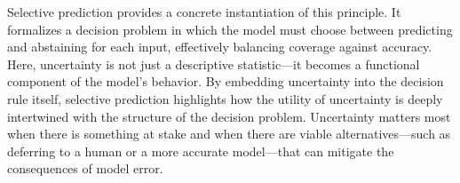 Selective prediction provides a concrete instantiation of this principle. It formalizes a decision problem in which the model must choose between predicting and abstaining for each input, effectively balancing coverage against accuracy. Here, uncertainty is not just a descriptive statistic—it becomes a functional component of the model’s behavior. By embedding uncertainty into the decision rule itself, selective prediction highlights how the utility of uncertainty is deeply intertwined with the structure of the decision problem. Uncertainty matters most when there is something at stake and when there are viable alternatives—such as deferring to a human or a more accurate model—that can mitigate the consequences of model error.



